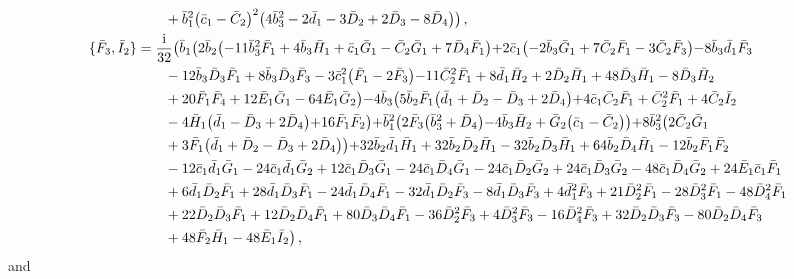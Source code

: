 \documentclass[10pt]{amsart}
\theoremstyle{definition}
\theoremstyle{corollary}
\theoremstyle{remark}
\theoremstyle{conclusion}
\begin{document}
\begin{align}
& \hskip 0.7cm+\bar{b}_1^2 \bigl(\bar{c}_1-\bar{C}_2\bigl)^2 \bigl(4 \bar{b}_3^2-2 \bar{d}_1-3 \bar{D}_2+2 \bar{D}_3-8 \bar{D}_4\bigl)\bigl) \, ,\\
\{\bar{F}_3, \bar{I}_2\}&=\frac{{\rm i}}{32}  \bigl(\bar{b}_1 \bigl(2 \bar{b}_2 \bigl(-11 \bar{b}_3^2 \bar{F}_1+4 \bar{b}_3 \bar{H}_1+\bar{c}_1 \bar{G}_1-\bar{C}_2 \bar{G}_1+7 \bar{D}_4 \bar{F}_1\bigl)+2 \bar{c}_1 \bigl(-2 \bar{b}_3 \bar{G}_1+7 \bar{C}_2 \bar{F}_1-3 \bar{C}_2 \bar{F}_3\bigl)-8 \bar{b}_3 \bar{d}_1 \bar{F}_3 \nonumber \\
& \hskip 0.7cm-12 \bar{b}_3 \bar{D}_3 \bar{F}_1+8 \bar{b}_3 \bar{D}_3 \bar{F}_3-3 \bar{c}_1^2 \bigl(\bar{F}_1-2 \bar{F}_3\bigl)-11 \bar{C}_2^2 \bar{F}_1+8 \bar{d}_1 \bar{H}_2+2 \bar{D}_2 \bar{H}_1+48 \bar{D}_3 \bar{H}_1-8 \bar{D}_3 \bar{H}_2 \nonumber \\
& \hskip 0.7cm+20 \bar{F}_1 \bar{F}_4+12 \bar{E}_1 \bar{G}_1-64 \bar{E}_1 \bar{G}_2\bigl)-4 \bar{b}_3 \bigl(5 \bar{b}_2 \bar{F}_1 \bigl(\bar{d}_1+\bar{D}_2-\bar{D}_3+2 \bar{D}_4\bigl)+4 \bar{c}_1 \bar{C}_2 \bar{F}_1+\bar{C}_2^2 \bar{F}_1+4 \bar{C}_2 \bar{I}_2 \nonumber \\
& \hskip 0.7cm-4 \bar{H}_1 \bigl(\bar{d}_1-\bar{D}_3+2 \bar{D}_4\bigl)+16 \bar{F}_1 \bar{F}_2\bigl)+\bar{b}_1^2 \bigl(2 \bar{F}_3 \bigl(\bar{b}_3^2+\bar{D}_4\bigl)-4 \bar{b}_3 \bar{H}_2+\bar{G}_2 \bigl(\bar{c}_1-\bar{C}_2\bigl)\bigl)+8 \bar{b}_3^2 \bigl(2 \bar{C}_2 \bar{G}_1 \nonumber \\
& \hskip 0.7cm +3 \bar{F}_1 \bigl(\bar{d}_1+\bar{D}_2-\bar{D}_3+2 \bar{D}_4\bigl)\bigl)+32 \bar{b}_2 \bar{d}_1 \bar{H}_1+32 \bar{b}_2 \bar{D}_2 \bar{H}_1-32 \bar{b}_2 \bar{D}_3 \bar{H}_1+64 \bar{b}_2 \bar{D}_4 \bar{H}_1-12 \bar{b}_2 \bar{F}_1 \bar{F}_2 \nonumber \\
& \hskip 0.7cm-12 \bar{c}_1 \bar{d}_1 \bar{G}_1-24 \bar{c}_1 \bar{d}_1 \bar{G}_2+12 \bar{c}_1 \bar{D}_3 \bar{G}_1-24 \bar{c}_1 \bar{D}_4 \bar{G}_1-24 \bar{c}_1 \bar{D}_2 \bar{G}_2+24 \bar{c}_1 \bar{D}_3 \bar{G}_2-48 \bar{c}_1 \bar{D}_4 \bar{G}_2+24 \bar{E}_1 \bar{c}_1 \bar{F}_1 \nonumber \\
& \hskip 0.7cm+6 \bar{d}_1 \bar{D}_2 \bar{F}_1+28 \bar{d}_1 \bar{D}_3 \bar{F}_1-24 \bar{d}_1 \bar{D}_4 \bar{F}_1-32 \bar{d}_1 \bar{D}_2 \bar{F}_3-8 \bar{d}_1 \bar{D}_3 \bar{F}_3+4 \bar{d}_1^2 \bar{F}_3+21 \bar{D}_2^2 \bar{F}_1-28 \bar{D}_3^2 \bar{F}_1-48 \bar{D}_4^2 \bar{F}_1 \nonumber \\
& \hskip 0.7cm+22 \bar{D}_2 \bar{D}_3 \bar{F}_1+12 \bar{D}_2 \bar{D}_4 \bar{F}_1+80 \bar{D}_3 \bar{D}_4 \bar{F}_1-36 \bar{D}_2^2 \bar{F}_3+4 \bar{D}_3^2 \bar{F}_3-16 \bar{D}_4^2 \bar{F}_3+32 \bar{D}_2 \bar{D}_3 \bar{F}_3-80 \bar{D}_2 \bar{D}_4 \bar{F}_3 \nonumber \\
& \hskip 0.7cm+48 \bar{F}_2 \bar{H}_1-48 \bar{E}_1 \bar{I}_2\bigl) \, , \nonumber 
\end{align} and
\end{document}
